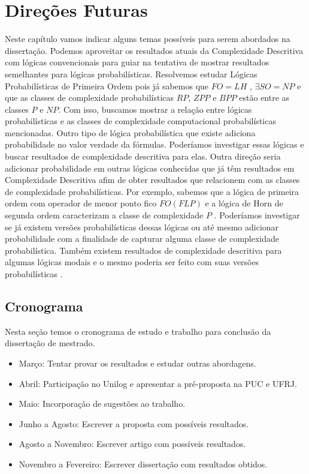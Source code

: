 \pagestyle{empty}
\cleardoublepage
\pagestyle{fancy}
\chapter{Direções Futuras}\label{cap5}

Neste capítulo vamos indicar alguns temas possíveis para serem abordados na dissertação.
Podemos aproveitar os resultados atuais da Complexidade Descritiva com lógicas convencionais para guiar na tentativa de mostrar resultados semelhantes para lógicas probabilísticas. Resolvemos estudar Lógicas Probabilísticas de Primeira Ordem pois já sabemos que $FO = LH$ \cite{immerman99}, $\exists SO = NP$ e que as classes de complexidade probabilísticas $RP$, $ZPP$ e $BPP$ estão entre as classes $P$ e $NP$. Com isso, buscamos mostrar a relação entre lógicas probabilísticas e as classes de complexidade computacional probabilísticas mencionadas. Outro tipo de lógica probabilística que existe adiciona probabilidade no valor verdade da fórmulas. Poderíamos investigar essas lógicas e buscar resultados de complexidade descritiva para elas. Outra direção seria adicionar probabilidade em outras lógicas conhecidas que já têm resultados em Complexidade Descritiva afim de obter resultados que relacionem com as classes de complexidade probabilísticas. Por exemplo, sabemos que a lógica de primeira ordem com operador de menor ponto fico $FO(FLP)$ e a lógica de Horn de segunda ordem caracterizam a classe de complexidade $P$ \cite{immerman99}. Poderíamos investigar se já existem versões probabilísticas dessas lógicas ou até mesmo adicionar probabilidade com a finalidade de capturar alguma classe de complexidade probabilística. Também existem resultados de complexidade descritiva para algumas lógicas modais \cite{Cibele2009} e o mesmo poderia ser feito com suas versões probabilísticas \cite{BrazdilFKK08, Heifetz1998}.

\section{Cronograma}
Nesta seção temos o cronograma de estudo e trabalho para conclusão da dissertação de mestrado.

\begin{itemize}
 \item Março: Tentar provar os resultados e estudar outras abordagens.
 \item Abril: Participação no Unilog e apresentar a pré-proposta na PUC e UFRJ.
 \item Maio: Incorporação de sugestões ao trabalho.
 \item Junho a Agosto: Escrever a proposta com possíveis resultados.
 \item Agosto a Novembro: Escrever artigo com possíveis resultados.
 \item Novembro a Fevereiro: Escrever dissertação com resultados obtidos.
\end{itemize}
